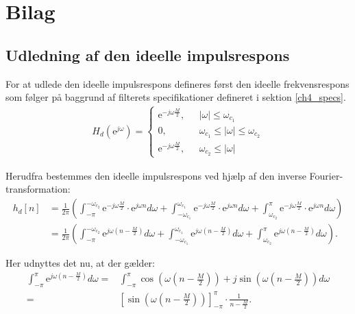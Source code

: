 \chapter{Bilag}
\section{Udledning af den ideelle impulsrespons} \label{app1}
For at udlede den ideelle impulsrespons defineres først den ideelle frekvensrespons som følger på baggrund af filterets specifikationer defineret i sektion \ref{ch4_specs}.
\begin{align*}
 H_d(\text{e}^{j\omega})= \begin{cases}
  \text{e}^{-j\omega\frac{M}{2}}, \ \ \ & |\omega| \leq\omega_{c_1} \\
 0, \ \ \ & \omega_{c_1} \leq |\omega| \leq \omega_{c_2} \\
  \text{e}^{-j\omega\frac{M}{2}}, \ \ \ & \omega_{c_2} \leq |\omega| 
\end{cases}
\end{align*}
  
Herudfra bestemmes den ideelle impulsrespons ved hjælp af den inverse Fourier-transformation:
\begin{align*}
h_d[n] &= \frac{1}{2\pi} \left(  \int_{-\pi}^{-\omega_{c_2}} \text{e}^{-j\omega \frac{M}{2}} \cdot \text{e}^{j \omega n} d\omega + \int_{-\omega_{c_1}}^{\omega_{c_1}} \text{e}^{-j\omega \frac{M}{2}} \cdot \text{e}^{j \omega n} d\omega +\int_{\omega_{c_2}}^{\pi} \text{e}^{-j\omega \frac{M}{2}} \cdot \text{e}^{j \omega n} d\omega	\right) \\
&= \frac{1}{2\pi} \left(  \int_{-\pi}^{-\omega_{c_2}} \text{e}^{j\omega \left(n- \frac{M}{2} \right) } d\omega + \int_{-\omega_{c_1}}^{\omega_{c_1}} \text{e}^{j\omega \left(n- \frac{M}{2} \right) }  d\omega + \int_{\omega_{c_2}}^{\pi} \text{e}^{j\omega \left( n-\frac{M}{2} \right) } d\omega	\right).
\end{align*}

Her udnyttes det nu, at der gælder:
\begin{align*}
\int_{-\pi}^{\pi} \text{e}^{j\omega \left(n- \frac{M}{2} \right) }  d\omega =& \int_{-\pi}^{\pi} \cos\left( \omega \left(n-\frac{M}{2}\right)\right)+j \sin \left( \omega \left(n-\frac{M}{2}\right) \right) d\omega \\
=& \left[ \sin\left(\omega \left(n-\frac{M}{2}\right)\right) \right]_{-\pi}^{\pi} \cdot \frac{1}{n- \frac{M}{2}}.
\end{align*}

